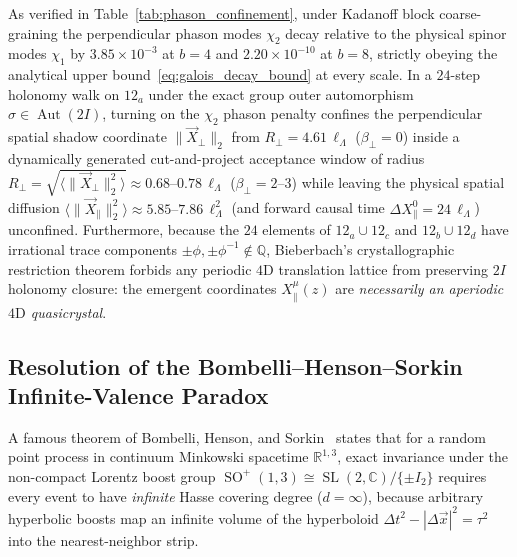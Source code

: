 \documentclass[11pt,a4paper]{article}
\theoremstyle{definition}
\theoremstyle{remark}
\newcommand{\R}{\mathbb{R}}
\newcommand{\C}{\mathbb{C}}
\newcommand{\Q}{\mathbb{Q}}
\newcommand{\SO}{\operatorname{SO}}
\newcommand{\SL}{\operatorname{SL}}
\begin{document}
As verified in Table~\ref{tab:phason_confinement}, under Kadanoff block coarse-graining the perpendicular phason modes $\chi_2$ decay relative to the physical spinor modes $\chi_1$ by $3.85 \times 10^{-3}$ at $b = 4$ and $2.20 \times 10^{-10}$ at $b = 8$, strictly obeying the analytical upper bound~\eqref{eq:galois_decay_bound} at every scale. In a $24$-step holonomy walk on $12_a$ under the exact group outer automorphism $\sigma \in \operatorname{Aut}(2I)$, turning on the $\chi_2$ phason penalty confines the perpendicular spatial shadow coordinate $\|\vec{X}_\perp\|_2$ from $R_\perp = 4.61\,\ell_\Lambda$ ($\beta_\perp = 0$) inside a dynamically generated cut-and-project acceptance window of radius $R_\perp = \sqrt{\langle\|\vec{X}_\perp\|_2^2\rangle} \approx 0.68\text{--}0.78\,\ell_\Lambda$ ($\beta_\perp = 2\text{--}3$) while leaving the physical spatial diffusion $\langle\|\vec{X}_\parallel\|_2^2\rangle \approx 5.85\text{--}7.86\,\ell_\Lambda^2$ (and forward causal time $\Delta X_\parallel^0 = 24\,\ell_\Lambda$) unconfined. Furthermore, because the $24$ elements of $12_a \cup 12_c$ and $12_b \cup 12_d$ have irrational trace components $\pm\phi, \pm\phi^{-1} \notin \Q$, Bieberbach's crystallographic restriction theorem forbids any periodic $4\text{D}$ translation lattice from preserving $2I$ holonomy closure: the emergent coordinates $X_\parallel^\mu(z)$ are \emph{necessarily an aperiodic $4\text{D}$ quasicrystal}.

\subsection{Resolution of the Bombelli--Henson--Sorkin Infinite-Valence Paradox}

A famous theorem of Bombelli, Henson, and Sorkin~\cite{BombelliHensonSorkin2009} states that for a random point process in continuum Minkowski spacetime $\R^{1,3}$, exact invariance under the non-compact Lorentz boost group $\SO^+(1,3) \cong \SL(2,\C)/\{\pm I_2\}$ requires every event to have \emph{infinite} Hasse covering degree ($d = \infty$), because arbitrary hyperbolic boosts map an infinite volume of the hyperboloid $\Delta t^2 - |\Delta \vec{x}|^2 = \tau^2$ into the nearest-neighbor strip.
\end{document}
